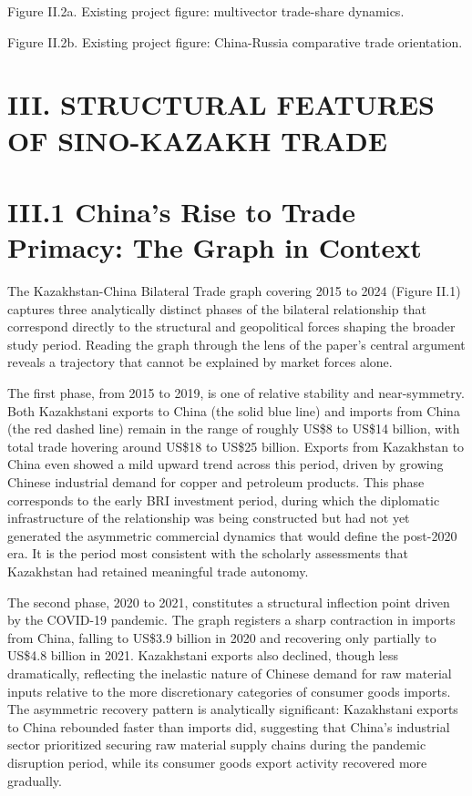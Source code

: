 \documentclass[12pt]{article}
\begin{document}
Figure II.2a. Existing project figure: multivector trade-share dynamics.\par

Figure II.2b. Existing project figure: China-Russia comparative trade orientation.\par
\section{III. STRUCTURAL FEATURES OF SINO-KAZAKH TRADE}

\section{III.1 China's Rise to Trade Primacy: The Graph in Context}

The Kazakhstan-China Bilateral Trade graph covering 2015 to 2024 (Figure II.1) captures three analytically distinct phases of the bilateral relationship that correspond directly to the structural and geopolitical forces shaping the broader study period. Reading the graph through the lens of the paper's central argument reveals a trajectory that cannot be explained by market forces alone.\par

The first phase, from 2015 to 2019, is one of relative stability and near-symmetry. Both Kazakhstani exports to China (the solid blue line) and imports from China (the red dashed line) remain in the range of roughly US\$8 to US\$14 billion, with total trade hovering around US\$18 to US\$25 billion. Exports from Kazakhstan to China even showed a mild upward trend across this period, driven by growing Chinese industrial demand for copper and petroleum products. This phase corresponds to the early BRI investment period, during which the diplomatic infrastructure of the relationship was being constructed but had not yet generated the asymmetric commercial dynamics that would define the post-2020 era. It is the period most consistent with the scholarly assessments that Kazakhstan had retained meaningful trade autonomy.\par

The second phase, 2020 to 2021, constitutes a structural inflection point driven by the COVID-19 pandemic. The graph registers a sharp contraction in imports from China, falling to US\$3.9 billion in 2020 and recovering only partially to US\$4.8 billion in 2021. Kazakhstani exports also declined, though less dramatically, reflecting the inelastic nature of Chinese demand for raw material inputs relative to the more discretionary categories of consumer goods imports. The asymmetric recovery pattern is analytically significant: Kazakhstani exports to China rebounded faster than imports did, suggesting that China's industrial sector prioritized securing raw material supply chains during the pandemic disruption period, while its consumer goods export activity recovered more gradually.\par
\end{document}
